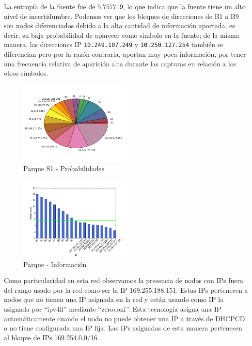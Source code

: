 \documentclass[final,inline,narroweqnarray,a4paper]{ieee}
\begin{document}
La entropía de la fuente fue de $5.757719$, lo que indica que la fuente tiene un alto nivel de incertidumbre. Podemos ver que los bloques de direcciones de B1 a B9 son nodos diferenciados debido a la alta cantidad de información aportada, es decir, su baja probabilidad de aparecer como símbolo en la fuente; de la misma manera, las direcciones IP \texttt{10.249.107.249} y \texttt{10.250.127.254} también se diferencian pero por la razón contraria, aportan muy poca información, por tener una frecuencia relativa de aparición alta durante las capturas en relación a los otros símbolos.

\begin{figure}[H]
    \begin{center}
        \includegraphics[width=0.5\textwidth]{plot/parqueS1-pie.png}
        \caption{Parque S1 - Probabilidades}
        \label{torta:parqueS1}
    \end{center}
\end{figure} 

\begin{figure}[H]
    \begin{center}
        \includegraphics[width=0.5\textwidth]{plot/parqueS1-bar.png}
        \caption{Parque - Información}
        \label{histo:parqueS1}
    \end{center}
\end{figure}

Como particularidad en esta red observamos la presencia de nodos con IPs fuera del rango usado por la red como ser la IP 169.255.188.151. Estas IPs pertenecen a nodos que no tienen una IP asignada en la red y están usando como IP la asignada por ``ipv4ll'' mediante ``zeroconf''. Esta tecnología asigna una IP automáticamente cuando el nodo no puede obtener una IP a través de DHCPCD o no tiene configurada una IP fija. Las IPs asignadas de esta manera pertenecen al bloque de IPs 169.254.0.0/16.
\end{document}
